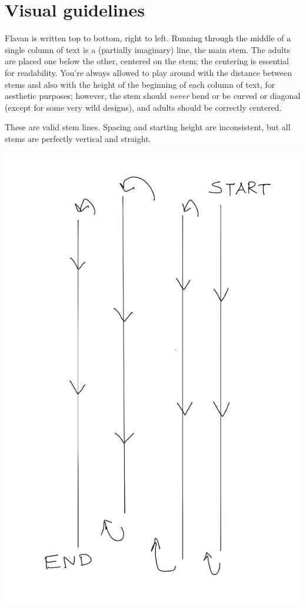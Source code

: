 \documentclass[10pt,oneside]{memoir}
\begin{document}
\section{Visual guidelines}

\vfill

\begin{minipage}{0.5\textwidth}
Flavan is written top to bottom, right to left. Running through the middle of a single column of text is a (partially imaginary) line, the main stem. The adults are placed one below the other, centered on the stem; the centering is essential for readability. You're always allowed to play around with the distance between stems and also with the height of the beginning of each column of text, for aesthetic purposes; however, the stem should \emph{never} bend or be curved or diagonal (except for some very wild designs), and adults should be correctly centered. 

These are valid stem lines. Spacing and starting height are inconsistent, but all stems are perfectly vertical and straight.
\end{minipage}
\hfill
\begin{minipage}{0.45\textwidth}
    \centering
    \includegraphics{stems}
\end{minipage}
\end{document}
